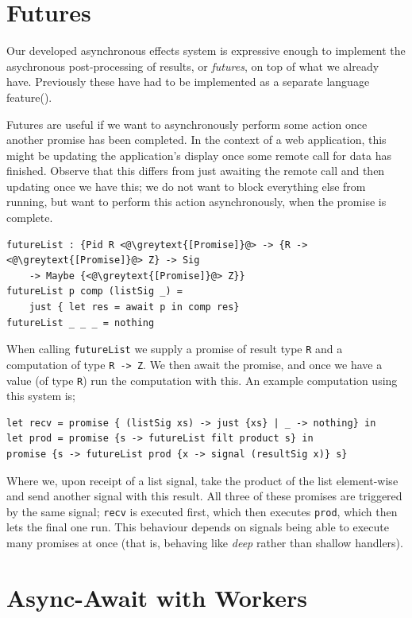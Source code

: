 \documentclass[msc,deptreport,cs]{infthesis} %
\newcommand{\code}[1]{\lstinline{#1}}
\newcommand{\greytext}[1]{\textcolor{black!40}{#1}}
\begin{document}
\section{Futures}
\label{sec:futures}

Our developed asynchronous effects system is expressive enough to implement the
asychronous post-processing of results, or \emph{futures}, on top of what we
already have. Previously these have had to be implemented as a separate language
feature(\cite{schwinghammer2002concurrent}).

Futures are useful if we want to asynchronously perform some action once another
promise has been completed. In the context of a web application, this might be
updating the application's display once some remote call for data has finished.
Observe that this differs from just awaiting the remote call and then updating
once we have this; we do not want to block everything else from running, but
want to perform this action asynchronously, when the promise is complete.

\begin{lstlisting}
futureList : {Pid R <@\greytext{[Promise]}@> -> {R -> <@\greytext{[Promise]}@> Z} -> Sig
    -> Maybe {<@\greytext{[Promise]}@> Z}}
futureList p comp (listSig _) =
    just { let res = await p in comp res}
futureList _ _ _ = nothing
\end{lstlisting}

\noindent When calling \code{futureList} we supply a promise of result type
\code{R} and a computation of type \code{R -> Z}. We then await the promise, and
once we have a value (of type \code{R}) run the computation with this. An
example computation using this system is;

\begin{lstlisting}
let recv = promise { (listSig xs) -> just {xs} | _ -> nothing} in
let prod = promise {s -> futureList filt product s} in
promise {s -> futureList prod {x -> signal (resultSig x)} s}
\end{lstlisting}

\noindent Where we, upon receipt of a list signal, take the product of the list
element-wise and send another signal with this result. All three of these
promises are triggered by the same signal; \code{recv} is executed first, which
then executes \code{prod}, which then lets the final one run. This behaviour
depends on signals being able to execute many promises at once (that is,
behaving like \emph{deep} rather than shallow handlers).

\section{Async-Await with Workers}
\end{document}
